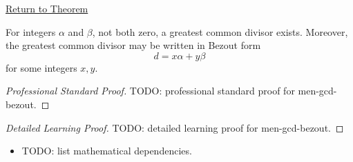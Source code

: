 \newpage
{}
\label{prf:men-gcd-bezout}

\begin{remark*}[Return]
\hyperref[thm:men-gcd-bezout]{Return to Theorem}
\end{remark*}

\begin{theorem*}
For integers \(\alpha\) and \(\beta\), not both zero, a greatest common divisor
exists. Moreover, the greatest common divisor may be written in Bezout form
\[
  d = x\alpha+y\beta
\]
for some integers \(x,y\).
\end{theorem*}

\begin{proof}[Professional Standard Proof]
\LRAProofBodyStart
TODO: professional standard proof for men-gcd-bezout.
\end{proof}

\begin{proof}[Detailed Learning Proof]
\LRAProofBodyStart
TODO: detailed learning proof for men-gcd-bezout.
\end{proof}

\begin{remark*}
\end{remark*}

\begin{dependencies}
\begin{itemize}
  \item TODO: list mathematical dependencies.
\end{itemize}
\end{dependencies}

\clearpage
